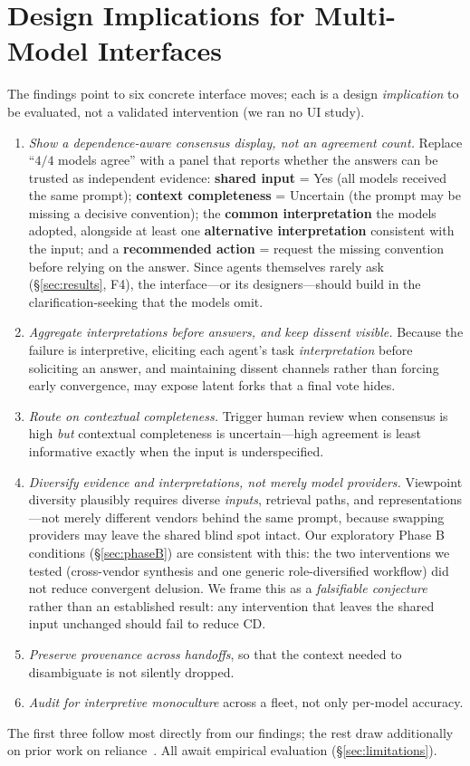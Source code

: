 \documentclass[acmsmall,screen,review,anonymous]{acmart}
\newcommand{\cd}{\textsf{CD}}
\begin{document}
\section{Design Implications for Multi-Model Interfaces}
\label{sec:implications}
The findings point to six concrete interface moves; each is a design \emph{implication} to be evaluated, not
a validated intervention (we ran no UI study).
\begin{enumerate}
\item \emph{Show a dependence-aware consensus display, not an agreement count.} Replace ``$4/4$ models
agree'' with a panel that reports whether the answers can be trusted as independent evidence:
\textbf{shared input} = Yes (all models received the same prompt); \textbf{context completeness} = Uncertain
(the prompt may be missing a decisive convention); the \textbf{common interpretation} the models adopted,
alongside at least one \textbf{alternative interpretation} consistent with the input; and a
\textbf{recommended action} = request the missing convention before relying on the answer. Since agents
themselves rarely ask (\S\ref{sec:results}, F4), the interface---or its designers---should build in the
clarification-seeking that the models omit.
\item \emph{Aggregate interpretations before answers, and keep dissent visible.} Because the failure is
interpretive, eliciting each agent's task \emph{interpretation} before soliciting an answer, and maintaining
dissent channels rather than forcing early convergence, may expose latent forks that a final vote hides.
\item \emph{Route on contextual completeness.} Trigger human review when consensus is high \emph{but}
contextual completeness is uncertain---high agreement is least informative exactly when the input is
underspecified.
\item \emph{Diversify evidence and interpretations, not merely model providers.} Viewpoint diversity
plausibly requires diverse \emph{inputs}, retrieval paths, and representations---not merely different vendors
behind the same prompt, because swapping providers may leave the shared blind spot intact. Our exploratory
Phase B conditions (\S\ref{sec:phaseB}) are consistent with this: the two interventions we tested
(cross-vendor synthesis and one generic role-diversified workflow) did not reduce convergent delusion. We
frame this as a \emph{falsifiable conjecture} rather than an established result: any intervention that
leaves the shared input unchanged should fail to reduce \cd{}.
\item \emph{Preserve provenance across handoffs}, so that the context needed to disambiguate is not silently
dropped.
\item \emph{Audit for interpretive monoculture} across a fleet, not only per-model accuracy.
\end{enumerate}
\noindent The first three follow most directly from our findings; the rest draw additionally on prior work on
reliance~\cite{vasconcelos2023explanations}. All await empirical evaluation (\S\ref{sec:limitations}).
\end{document}

